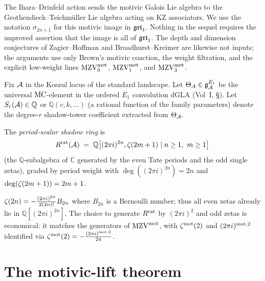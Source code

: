 The Ihara--Drinfeld action sends the motivic Galois Lie algebra to
the Grothendieck--Teichm\"uller Lie algebra acting on KZ associators.
We use the notation $\sigma_{2n+1}$ for this motivic image in $\mathfrak{grt}_1$.
Nothing in the sequel requires the unproved assertion that the image is
all of $\mathfrak{grt}_1$. The depth and dimension conjectures of
Zagier--Hoffman and Broadhurst--Kreimer are likewise not inputs; the
arguments use only Brown's motivic coaction, the weight filtration, and
the explicit low-weight lines $\mathrm{MZV}^{\mathrm{mot}}_0$, $\mathrm{MZV}^{\mathrm{mot}}_1$, and
$\mathrm{MZV}^{\mathrm{mot}}_3$.

\begin{definition}
Fix $\mathcal{A}$ in the Koszul locus of the standard landscape. Let
$\Theta_{\mathcal{A}} \in \mathfrak{g}^{E_1}_{\mathcal{A}}$ be the universal
$\mathrm{MC}$-element in the ordered $E_1$ convolution dGLA (Vol~I,
\S{}). Let $S_r(\mathcal{A}) \in \mathbb{Q}$
or $\mathbb{Q}(c, k, \ldots)$ (a rational function of the family
parameters) denote the degree-$r$ shadow-tower coefficient
extracted from $\Theta_{\mathcal{A}}$.

The \emph{period-scalar shadow ring} is
\[
 R^{\mathrm{rat}}(\mathcal{A}) \;=\; \mathbb{Q}\bigl[(2\pi i)^{2n}, \zeta(2m+1)
 \mid n\geq1,\ m\geq1\bigr]
\]
(the $\mathbb{Q}$-subalgebra of $\mathbb{C}$ generated by the even
Tate periods and the odd single zetas), graded by period weight with
$\deg((2\pi i)^{2n}) = 2n$ and
$\deg(\zeta(2m+1)) = 2m+1$.
\end{definition}

\begin{remark}
$\zeta(2n) = -\tfrac{(2\pi i)^{2n}}{2 (2n)!} B_{2n}$ where
$B_{2n}$ is a Bernoulli number; thus all even zetas already lie
in $\mathbb{Q}[(2\pi i)^{2n}]$. The choice to generate $R^{\mathrm{rat}}$
by $(2\pi i)^2$ and odd zetas is economical: it matches the
generators of $\mathrm{MZV}^{\mathrm{mot}}$, with $\zeta^{\mathrm{mot}}(2)$ and
$(2\pi i)^{\mathrm{mot},2}$ identified via
$\zeta^{\mathrm{mot}}(2) = -\tfrac{(2\pi i)^{\mathrm{mot},2}}{24}$.
\end{remark}

\section{The motivic-lift theorem}
\label{sec:mot-lift-thm}

